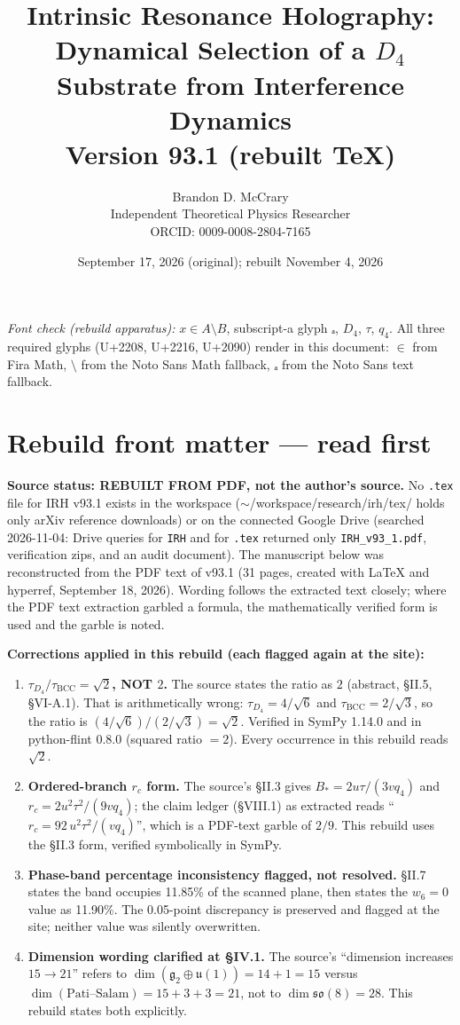 \documentclass[11pt,a4paper]{article}
\title{Intrinsic Resonance Holography:\\Dynamical Selection of a $D_4$ Substrate from Interference Dynamics\\[0.4em]\large Version 93.1 (rebuilt \TeX)}
\author{Brandon D. McCrary\\Independent Theoretical Physics Researcher\\ORCID: 0009-0008-2804-7165}
\date{September 17, 2026 (original); rebuilt November 4, 2026}
\begin{document}
\maketitle

\noindent\textit{Font check (rebuild apparatus):} $x \in A \setminus B$, subscript-a glyph {\notosans ₐ}, $D_4$, $\tau$, $q_4$. All three required glyphs (U+2208, U+2216, U+2090) render in this document: $\in$ from Fira Math, $\setminus$ from the Noto Sans Math fallback, {\notosans ₐ} from the Noto Sans text fallback.

\section*{Rebuild front matter --- read first}

\textbf{Source status: REBUILT FROM PDF, not the author's source.} No \texttt{.tex} file for IRH v93.1 exists in the workspace ($\sim$/workspace/research/irh/tex/ holds only arXiv reference downloads) or on the connected Google Drive (searched 2026-11-04: Drive queries for \texttt{IRH} and for \texttt{.tex} returned only \texttt{IRH\_v93\_1.pdf}, verification zips, and an audit document). The manuscript below was reconstructed from the PDF text of v93.1 (31 pages, created with \LaTeX{} and hyperref, September 18, 2026). Wording follows the extracted text closely; where the PDF text extraction garbled a formula, the mathematically verified form is used and the garble is noted.

\textbf{Corrections applied in this rebuild (each flagged again at the site):}
\begin{enumerate}
\item \textbf{$\tau_{D_4}/\tau_{\mathrm{BCC}} = \sqrt{2}$, NOT $2$.} The source states the ratio as $2$ (abstract, \S II.5, \S VI-A.1). That is arithmetically wrong: $\tau_{D_4} = 4/\sqrt{6}$ and $\tau_{\mathrm{BCC}} = 2/\sqrt{3}$, so the ratio is $(4/\sqrt{6})/(2/\sqrt{3}) = \sqrt{2}$. Verified in SymPy 1.14.0 and in python-flint 0.8.0 (squared ratio $= 2$). Every occurrence in this rebuild reads $\sqrt{2}$.
\item \textbf{Ordered-branch $r_c$ form.} The source's \S II.3 gives $B_* = 2u\tau/(3vq_4)$ and $r_c = 2u^2\tau^2/(9vq_4)$; the claim ledger (\S VIII.1) as extracted reads ``$r_c = 92\,u^2\tau^2/(vq_4)$'', which is a PDF-text garble of $2/9$. This rebuild uses the \S II.3 form, verified symbolically in SymPy.
\item \textbf{Phase-band percentage inconsistency flagged, not resolved.} \S II.7 states the band occupies 11.85\% of the scanned plane, then states the $w_6 = 0$ value as 11.90\%. The 0.05-point discrepancy is preserved and flagged at the site; neither value was silently overwritten.
\item \textbf{Dimension wording clarified at \S IV.1.} The source's ``dimension increases $15 \to 21$'' refers to $\dim(\mathfrak{g}_2 \oplus \mathfrak{u}(1)) = 14 + 1 = 15$ versus $\dim(\text{Pati--Salam}) = 15 + 3 + 3 = 21$, not to $\dim \mathfrak{so}(8) = 28$. This rebuild states both explicitly.
\end{enumerate}
\end{document}
